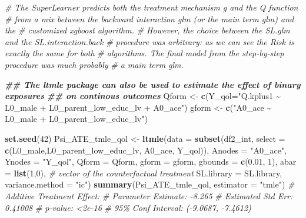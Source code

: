 \documentclass[
]{book}
\newenvironment{Shaded}{\begin{snugshade}}{\end{snugshade}}
\newcommand{\AttributeTok}[1]{\textcolor[rgb]{0.13,0.29,0.53}{#1}}
\newcommand{\CommentTok}[1]{\textcolor[rgb]{0.56,0.35,0.01}{\textit{#1}}}
\newcommand{\DecValTok}[1]{\textcolor[rgb]{0.00,0.00,0.81}{#1}}
\newcommand{\DocumentationTok}[1]{\textcolor[rgb]{0.56,0.35,0.01}{\textbf{\textit{#1}}}}
\newcommand{\FloatTok}[1]{\textcolor[rgb]{0.00,0.00,0.81}{#1}}
\newcommand{\FunctionTok}[1]{\textcolor[rgb]{0.13,0.29,0.53}{\textbf{#1}}}
\newcommand{\NormalTok}[1]{#1}
\newcommand{\OtherTok}[1]{\textcolor[rgb]{0.56,0.35,0.01}{#1}}
\newcommand{\StringTok}[1]{\textcolor[rgb]{0.31,0.60,0.02}{#1}}
\begin{document}
\begin{Shaded}
\begin{Highlighting}[]
\CommentTok{\# The SuperLearner predicts both the treatment mechanism g and the Q function}
\CommentTok{\# from a mix between the backward interaction glm (or the main term glm) and the }
\CommentTok{\# customized xgboost algorithm. }
\CommentTok{\# However, the choice between the SL.glm and the SL.interaction.back }
\CommentTok{\# procedure was arbitrary: as we can see the Risk is exactly the same for both }
\CommentTok{\# algorithms. The final model from the step{-}by{-}step procedure was much probably }
\CommentTok{\# a main term glm.}


\DocumentationTok{\#\# The \textasciigrave{}ltmle\textasciigrave{} package can also be used to estimate the effect of binary exposures}
\DocumentationTok{\#\# on continous outcomes}
\NormalTok{Qform }\OtherTok{\textless{}{-}} \FunctionTok{c}\NormalTok{(}\AttributeTok{Y\_qol=}\StringTok{"Q.kplus1 \textasciitilde{} L0\_male + L0\_parent\_low\_educ\_lv + A0\_ace"}\NormalTok{)}
\NormalTok{gform }\OtherTok{\textless{}{-}} \FunctionTok{c}\NormalTok{(}\StringTok{"A0\_ace \textasciitilde{} L0\_male + L0\_parent\_low\_educ\_lv"}\NormalTok{)}

\FunctionTok{set.seed}\NormalTok{(}\DecValTok{42}\NormalTok{)}
\NormalTok{Psi\_ATE\_tmle\_qol }\OtherTok{\textless{}{-}} \FunctionTok{ltmle}\NormalTok{(}\AttributeTok{data =} \FunctionTok{subset}\NormalTok{(df2\_int, }\AttributeTok{select =} \FunctionTok{c}\NormalTok{(L0\_male,L0\_parent\_low\_educ\_lv,}
\NormalTok{                                         A0\_ace,}
\NormalTok{                                         Y\_qol)),}
                      \AttributeTok{Anodes =} \StringTok{"A0\_ace"}\NormalTok{,}
                      \AttributeTok{Ynodes =} \StringTok{"Y\_qol"}\NormalTok{,}
                      \AttributeTok{Qform =}\NormalTok{ Qform,}
                      \AttributeTok{gform =}\NormalTok{ gform,}
                      \AttributeTok{gbounds =} \FunctionTok{c}\NormalTok{(}\FloatTok{0.01}\NormalTok{, }\DecValTok{1}\NormalTok{),}
                      \AttributeTok{abar =} \FunctionTok{list}\NormalTok{(}\DecValTok{1}\NormalTok{,}\DecValTok{0}\NormalTok{), }\CommentTok{\# vector of the counterfactual treatment }
                      \AttributeTok{SL.library =}\NormalTok{ SL.library,}
                      \AttributeTok{variance.method =} \StringTok{"ic"}\NormalTok{)}
\FunctionTok{summary}\NormalTok{(Psi\_ATE\_tmle\_qol, }\AttributeTok{estimator =} \StringTok{"tmle"}\NormalTok{)}
\CommentTok{\# Additive Treatment Effect:}
\CommentTok{\#    Parameter Estimate:  {-}8.265 }
\CommentTok{\#     Estimated Std Err:  0.41008 }
\CommentTok{\#               p{-}value:  \textless{}2e{-}16 }
\CommentTok{\#     95\% Conf Interval: ({-}9.0687, {-}7.4612)}
\end{Highlighting}
\end{Shaded}
\end{document}
